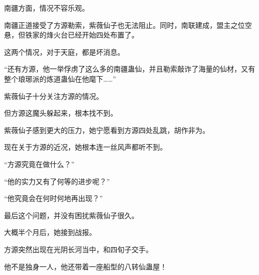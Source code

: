 \begin{this_body}
南疆方面，情况不容乐观。

南疆正道接受了方源勒索，紫薇仙子也无法阻止。同时，南联建成，盟主之位空悬，但铁家的烽火台已经开始四处布置了。

这两个情况，对于天庭，都是坏消息。

“还有方源，他一举俘虏了这么多的南疆蛊仙，并且勒索敲诈了海量的仙材，又有整个琅琊派的炼道蛊仙在他麾下……”

紫薇仙子十分关注方源的情况。

但方源这魔头躲起来，根本找不到。

紫薇仙子感到更大的压力，她宁愿看到方源四处乱跳，胡作非为。

现在关于方源的近况，她根本连一丝风声都听不到。

“方源究竟在做什么？”

“他的实力又有了何等的进步呢？”

“他究竟会在何时何地再出现？”

最后这个问题，并没有困扰紫薇仙子很久。

大概半个月后，她接到战报。

方源突然出现在光阴长河当中，和四旬子交手。

他不是独身一人，他还带着一座船型的八转仙蛊屋！

\end{this_body}

